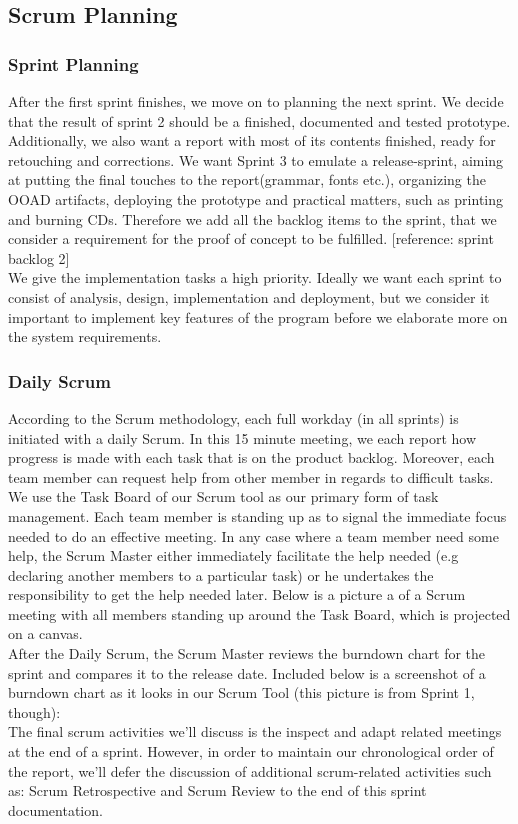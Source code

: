 \subsection{Scrum Planning}
\subsubsection{Sprint Planning}
After the first sprint finishes, we move on to planning the next sprint. We decide that the result of sprint 2 should be a finished, documented and tested prototype. Additionally, we also want a report with most of its contents finished, ready for retouching and corrections. We want Sprint 3 to emulate a release-sprint, aiming at putting the final touches to the report(grammar, fonts etc.), organizing the OOAD artifacts, deploying the prototype and practical matters, such as printing and burning CDs. Therefore we add all the backlog items to the sprint, that we consider a requirement for the proof of concept to be fulfilled. [reference: sprint backlog 2]\\
We give the implementation tasks a high priority. Ideally we want each sprint to consist of analysis, design, implementation and deployment, but we consider it important to implement key features of the program before we elaborate more on the system requirements.\\
\subsubsection{Daily Scrum}
According to the Scrum methodology, each full workday (in all sprints) is initiated with a daily Scrum. In this 15 minute meeting, we each report how progress is made with each task that is on the product backlog. Moreover, each team member can request help from other member in regards to difficult tasks. We use the Task Board of our Scrum tool as our primary form of task management. Each team member is standing up as to signal the immediate focus needed to do an effective meeting. In any case where a team member need some help, the Scrum Master either immediately facilitate the help needed (e.g declaring another members to a particular task) or he undertakes the responsibility to get the help needed later. Below is a picture a of a Scrum meeting with all members standing up around the Task Board, which is projected on a canvas.\\
After the Daily Scrum, the Scrum Master reviews the burndown chart for the sprint and compares it to the release date. Included below is a screenshot of a burndown chart as it looks in our Scrum Tool (this picture is from Sprint 1, though):\\
The final scrum activities we’ll discuss is the inspect and adapt related meetings at the end of a sprint. However, in order to maintain our chronological order of the report, we’ll defer the discussion of additional scrum-related activities such as: Scrum Retrospective and Scrum Review to the end of this sprint documentation.\\
\newpage
